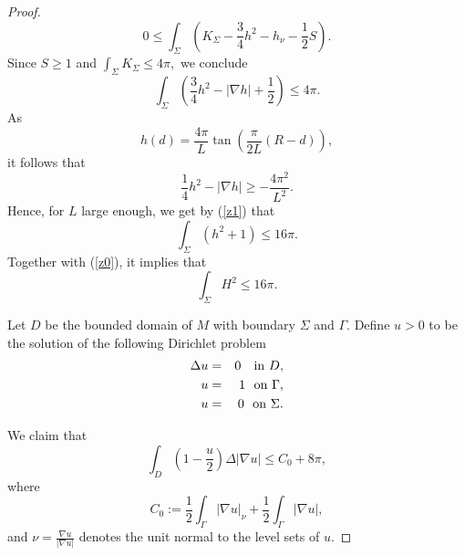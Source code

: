\documentclass{amsart}
\numberwithin{equation}{section}
\begin{document}
\begin{proof}
\begin{equation*}
0\leq \int_{\Sigma }\left( K_{\Sigma }-\frac{3}{4}h^{2}-h_{\nu }-\frac{1}{2}S\right) .
\end{equation*}%
Since $S\geq 1$ and $\int_{\Sigma }K_{\Sigma }\leq 4\pi,$ we conclude
\begin{equation}
\int_{\Sigma }\left( \frac{3}{4}h^{2}-\left\vert \nabla h\right\vert +\frac{1%
}{2}\right) \leq 4\pi .  \label{z1}
\end{equation}
As
\begin{equation*}
h\left( d\right) =\frac{4\pi }{L}\tan \left( \frac{\pi }{2L}(R-d)\right),
\end{equation*}
it follows that  
\begin{equation*}
\frac{1}{4}h^{2}-\left\vert \nabla h\right\vert \geq -\frac{4\pi ^{2}}{L^{2}}.
\end{equation*}%
Hence, for $L$ large enough, we get by (\ref{z1}) that  
\begin{equation*}
\int_{\Sigma }\left( h^{2}+1\right) \leq 16\pi.
\end{equation*}%
 Together with (\ref{z0}), it implies that 
\begin{equation}
\int_{\Sigma }H^{2}\leq 16\pi.  \label{z2}
\end{equation}

Let $D$ be the bounded domain of $M$ with boundary $\Sigma $ and $\Gamma$. 
Define $u>0$ to be the solution of the following Dirichlet problem 
\begin{eqnarray}
\Delta u &=&0\text{ \ \ in } D , \notag\\
u &=&1\text{ \ on } \Gamma , \label{D}\\
u &=&0\text{ \ on }\Sigma.\notag
\end{eqnarray}

We claim that 
\begin{equation}
\int_{D}\left( 1-\frac{u}{2}\right) \Delta \left\vert \nabla
u\right\vert \leq C_0+8\pi,  \label{z6}
\end{equation}
where $$
C_0:=\frac{1}{2} \int_{\Gamma }\left\vert \nabla
u\right\vert_\nu +\frac{1}{2} \int_{\Gamma }\left\vert \nabla
u\right\vert,
$$
and $\nu =\frac{\nabla u}{\left\vert \nabla u\right\vert }$ denotes the unit
normal to the level sets of $u$.


\end{proof}
\end{document}
